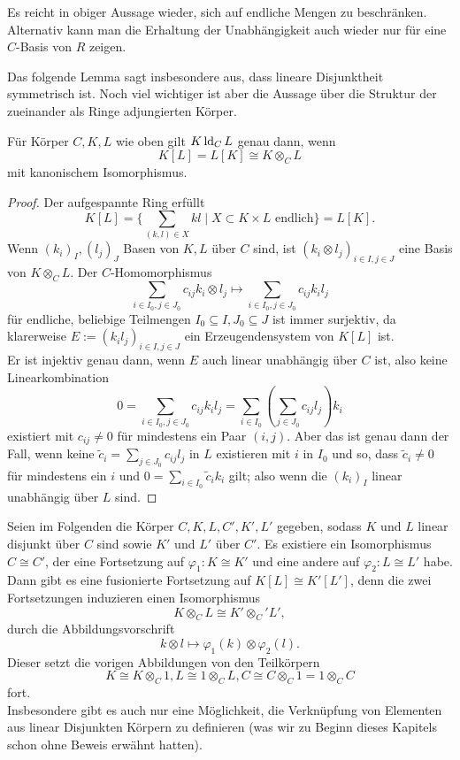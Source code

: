     \begin{remark}
    	Es reicht in obiger Aussage wieder, sich auf endliche Mengen zu beschränken. Alternativ kann man die Erhaltung der Unabhängigkeit auch wieder nur für eine $C$-Basis von $R$ zeigen.
    \end{remark}
    
    Das folgende Lemma sagt insbesondere aus, dass lineare Disjunktheit symmetrisch ist. Noch viel wichtiger ist aber die Aussage über die Struktur der zueinander als Ringe adjungierten Körper.
    \begin{lemma}\label{Tensoren}
    	Für Körper $C,K,L$ wie oben gilt $K\operatorname{ld}_CL$ genau dann, wenn $$K[L]=L[K]\cong K\otimes_CL$$ mit kanonischem Isomorphismus.
    \end{lemma}
    \begin{proof}
    	Der aufgespannte Ring erfüllt $$K[L]=\{\sum\limits_{(k,l)\in X}kl\mid X\subset K\times L\text{ endlich}\}=L[K].$$
    	Wenn $(k_i)_I,(l_j)_J$ Basen von $K,L$ über $C$ sind, ist $(k_i\otimes l_j)_{i\in I,j\in J}$ eine Basis von $K\otimes_CL$. Der $C$-Homomorphismus $$\sum\limits_{i\in I_0,j\in J_0} c_{ij}k_i\otimes l_j\mapsto \sum\limits_{i\in I_0,j\in J_0} c_{ij}k_il_j$$ für endliche, beliebige Teilmengen $I_0\subseteq I,J_0\subseteq J$ ist immer surjektiv, da klarerweise $E:=(k_il_j)_{i\in I,j\in J}$ ein Erzeugendensystem von $K[L]$ ist.\\
    	Er ist injektiv genau dann, wenn $E$ auch linear unabhängig über $C$ ist, also keine Linearkombination $$0=\sum\limits_{i\in I_0,j\in J_0}c_{ij}k_il_j=\sum\limits_{i\in I_0}(\sum\limits_{j\in J_0}c_{ij}l_j)k_i$$ existiert mit $c_{ij}\neq0$ für mindestens ein Paar $(i,j)$. Aber das ist genau dann der Fall, wenn keine $\tilde{c}_i=\sum\limits_{j\in J_0}c_{ij}l_j$ in $L$ existieren mit $i$ in $I_0$ und so, dass $\tilde{c}_i\neq0$ für mindestens ein $i$ und $0=\sum\limits_{i\in I_0}\tilde{c}_ik_i$ gilt; also wenn die $(k_i)_I$ linear unabhängig über $L$ sind.
    \end{proof}
    
    \begin{corollary}\label{Isomorphismen linear disjunkt}
    	Seien im Folgenden die Körper $C,K,L,C',K',L'$ gegeben, sodass $K$ und $L$ linear disjunkt über $C$ sind sowie $K'$ und $L'$ über $C'$. Es existiere ein Isomorphismus $C\cong C'$, der eine Fortsetzung auf $\varphi_1:K\cong K'$ und eine andere auf $\varphi_2:L\cong L'$ habe. Dann gibt es eine \glqq{}fusionierte\grqq{} Fortsetzung auf $K[L]\cong K'[L']$, denn die zwei Fortsetzungen induzieren einen Isomorphismus $$K\otimes_CL\cong K'\otimes_C'L',$$ durch die Abbildungsvorschrift $$k\otimes l\mapsto\varphi_1(k)\otimes\varphi_2(l).$$ Dieser setzt die vorigen Abbildungen von den Teilkörpern $$K\cong K\otimes_C1,L\cong1\otimes_CL,C\cong C\otimes_C1=1\otimes_CC$$ fort.\\
    	Insbesondere gibt es auch nur eine Möglichkeit, die Verknüpfung von Elementen aus linear Disjunkten Körpern zu definieren (was wir zu Beginn dieses Kapitels schon ohne Beweis erwähnt hatten).
    \end{corollary}
    

